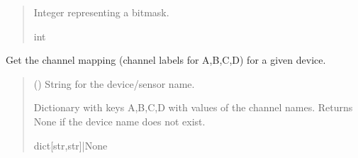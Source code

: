 \documentclass[letterpaper,10pt,english]{sphinxmanual}
\begin{document}
\begin{fulllineitems}
\begin{fulllineitems}
\begin{quote}
\begin{description}
\begin{itemize}
\end{itemize}

\sphinxAtStartPar
Integer representing a bitmask.

\sphinxAtStartPar
int

\end{description}\end{quote}

\end{fulllineitems}


\begin{fulllineitems}
\label{\detokenize{PodApi.Devices:PodApi.Devices.PodDevice_8401HR.Pod8401HR.GetChannelMapForPreampDevice}}
\pysigstartsignatures
{}
\pysigstopsignatures
\sphinxAtStartPar
Get the channel mapping (channel labels for A,B,C,D) for a given device.
\begin{quote}\begin{description}
\sphinxAtStartPar
{} () \textendash{} String for the device/sensor name.

\sphinxAtStartPar
Dictionary with keys A,B,C,D with values of the channel names. Returns                 None if the device name does not exist.

\sphinxAtStartPar
dict{[}str,str{]}|None

\end{description}\end{quote}

\end{fulllineitems}



\end{fulllineitems}
\end{document}

